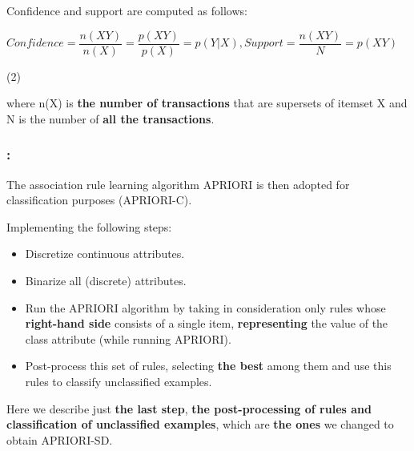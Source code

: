 \documentclass{beamer}
\begin{document}
\begin{CJK*}{UTF8}{bsmi}
\begin{frame}
	\begin{block}{Confidence and support are computed as follows:}
\begin{center}
$ 	Confidence=  \dfrac{n(XY)}{n(X)}= \dfrac{p(XY)}{p(X)} =p(Y|X),Support= \dfrac{n(XY)}{N} =p(XY) $
\end{center}
 \begin{flushright}
	(2) 
\end{flushright}
	\end{block}
	where n(X) is \textbf{the number of transactions} that are supersets of itemset X and N is the number of \textbf{all the transactions}.
\end{frame}
\begin{frame}
	\frametitle{\insertsection : \insertsubsection}
The association rule learning algorithm APRIORI is then adopted for classification purposes (APRIORI-C).
	\begin{block}{Implementing the following steps:}
			\begin{itemize}
				\item  Discretize continuous attributes.
				\item  Binarize all (discrete) attributes.
				\item Run the APRIORI algorithm by taking in consideration only rules whose \textbf{right-hand side} consists of a single item, \textbf{representing} the value of the class attribute (while running APRIORI).
				\item Post-process this set of rules, selecting \textbf{the best }among them and use this rules to classify unclassified examples.
			\end{itemize}
			Here we describe just\textbf{ the last step}, \textbf{the post-processing of rules and classification of unclassified examples}, which are \textbf{the ones} we changed to obtain APRIORI-SD.
	\end{block}
\end{frame}

\end{CJK*}
\end{document}
